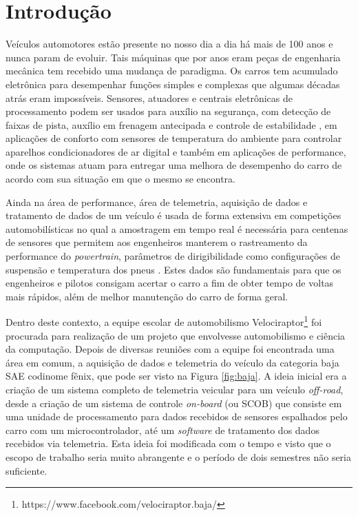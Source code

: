 \chapter{Introdução} 
	\label{ch:introducao}

Veículos automotores estão presente no nosso dia a dia há mais de 100 anos \cite{fordt} e nunca param de evoluir. Tais  máquinas que por anos eram peças de engenharia mecânica tem recebido uma mudança de paradigma. Os carros tem acumulado eletrônica para desempenhar funções simples e complexas que algumas décadas atrás eram impossíveis. Sensores, atuadores e centrais eletrônicas de processamento podem ser usados para auxílio na segurança, com detecção de faixas de pista, auxílio em frenagem antecipada e controle de estabilidade \cite{racecarInstrumentationFor2012}, em aplicações de conforto com sensores de temperatura do ambiente para controlar aparelhos condicionadores de ar digital e também em aplicações de performance, onde os sistemas atuam para entregar uma melhora de desempenho do carro de acordo com sua situação em que o mesmo se encontra.

Ainda na área de performance, área de telemetria, aquisição de dados e tratamento de dados de um veículo é usada de forma extensiva em competições automobilísticas no qual a amostragem em tempo real é necessária para centenas de sensores que permitem aos engenheiros manterem o rastreamento da performance do \textit{powertrain}, parâmetros de dirigibilidade como configurações de suspensão e temperatura dos pneus \cite{designAndImplementation2015}. Estes dados são fundamentais para que os engenheiros e pilotos consigam acertar o carro a fim de obter tempo de voltas mais rápidos, além de melhor manutenção do carro de forma geral.

Dentro deste contexto, a equipe escolar de automobilismo Velociraptor\footnote{https://www.facebook.com/velociraptor.baja/} foi procurada para realização de um projeto que envolvesse automobilismo e ciência da computação. Depois de diversas reuniões com a equipe foi encontrada uma área em comum, a aquisição de dados e telemetria do veículo da categoria baja SAE codinome fênix, que pode ser visto na Figura \ref{fig:baja}. A ideia inicial era a criação de um sistema completo de telemetria veicular para um veículo \textit{off-road}, desde a criação de um sistema de controle \textit{on-board} (ou SCOB) que consiste em uma unidade de processamento para dados recebidos de sensores espalhados pelo carro com um microcontrolador, até um \textit{software} de tratamento dos dados recebidos via telemetria. Esta ideia foi modificada com o tempo e visto que o escopo de trabalho seria muito abrangente e o período de dois semestres não seria suficiente.    

